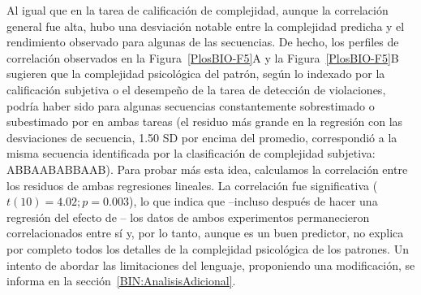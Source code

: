 
Al igual que en la tarea de calificación de complejidad, aunque la correlación general fue alta, hubo una desviación notable entre la complejidad predicha y el rendimiento observado para algunas de las secuencias. De hecho, los perfiles de correlación observados en la Figura~\ref{PlosBIO-F5}A y la Figura~\ref{PlosBIO-F5}B sugieren que la complejidad psicológica del patrón, según lo indexado por la calificación subjetiva o el desempeño de la tarea de detección de violaciones, podría haber sido para algunas secuencias constantemente sobrestimado o subestimado por \mdlbin en ambas tareas (el residuo más grande en la regresión con las desviaciones de secuencia, 1.50 SD por encima del promedio, correspondió a la misma secuencia identificada por la clasificación de complejidad subjetiva: ABBAABABBAAB). Para probar más esta idea, calculamos la correlación entre los residuos de ambas regresiones lineales. La correlación fue significativa ($t (10) = 4.02; p = 0.003$), lo que indica que --incluso después de hacer una regresión del efecto de \mdlbin-- los datos de ambos experimentos permanecieron correlacionados entre sí y, por lo tanto, aunque \mdlbin es un buen predictor, no explica por completo todos los detalles de la complejidad psicológica de los patrones. Un intento de abordar las limitaciones del lenguaje, proponiendo una modificación, se informa en la sección~\ref{BIN:AnalisisAdicional}.

